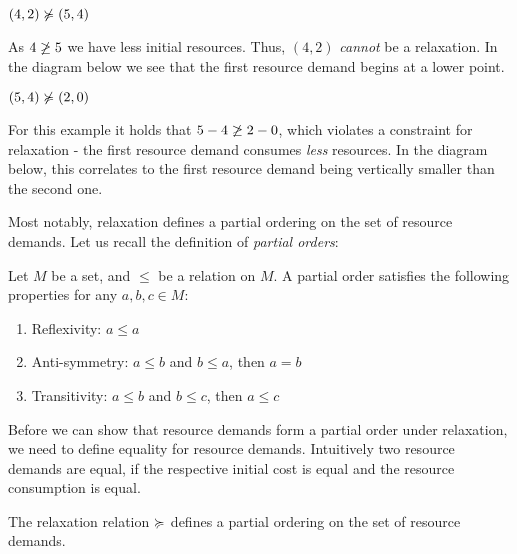 
\begin{example}
   \((4,2) \notrelaxation (5, 4)\)
\end{example}

As \(4 \centernot{\geq} 5\) we have less initial resources. Thus, \((4,2)\) \emph{cannot} be a relaxation. In the diagram below we see that the first resource demand begins at a lower point.


\begin{example}
   \((5, 4) \notrelaxation (2, 0)\)
\end{example}

For this example it holds that \(5 - 4 \centernot{\geq} 2 - 0\), which violates a constraint for relaxation - the first resource demand consumes \emph{less} resources. In the diagram below, this correlates to the first resource demand being vertically smaller than the second one.


Most notably, relaxation defines a partial ordering on the set of resource demands. Let us recall the definition of \emph{partial orders}:

\begin{definition}
   Let \(M\) be a set, and \(\leq\) be a relation on \(M\). A partial order satisfies the following properties for any \(a, b, c \in M\):
   \begin{enumerate}[label=\Roman*]
      \item Reflexivity: \(a \leq a \) 
      \item Anti-symmetry: \(a \leq b\) and \(b \leq a\), then \(a = b\) 
      \item Transitivity: \(a \leq b\) and \(b \leq c\), then \(a \leq c\)
   \end{enumerate}
\end{definition}

Before we can show that resource demands form a partial order under relaxation, we need to define equality for resource demands. Intuitively two resource demands are equal, if the respective initial cost is equal and the resource consumption is equal. 

\begin{lemma}
   The relaxation relation \(\succcurlyeq\) defines a partial ordering on the set of resource demands.
\end{lemma}

\newpage

